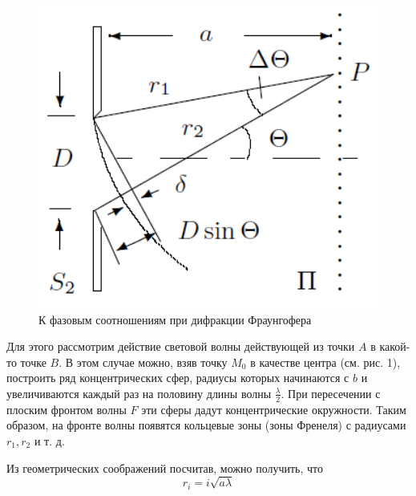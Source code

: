 \documentclass[a4paper,12pt]{report}
\begin{document}
\begin{figure}
  \begin{center}
    \includegraphics[width = 1\textwidth]{1.png}
  \end{center}
  \caption{К фазовым соотношениям при дифракции Фраунгофера}
  \vspace{+13pt}
\end{figure}

Для этого рассмотрим действие световой волны действующей из точки $A$ в какой-то точке $B$.
В этом случае можно, взяв точку $M_0$ в качестве центра (см. рис. 1), построить ряд концентрических сфер, радиусы которых начинаются с $b$ и увеличиваются каждый раз на половину длины волны $\frac{\lambda}{2}$. При пересечении с плоским фронтом волны $F$ эти сферы дадут концентрические окружности. Таким образом, на фронте волны появятся кольцевые зоны (зоны Френеля) с радиусами $r_1, r_2$ и т. д.

Из геометрических соображений посчитав, можно получить, что 
\begin{equation}
r_i = i \sqrt{a \lambda}
\end{equation}
\end{document}
